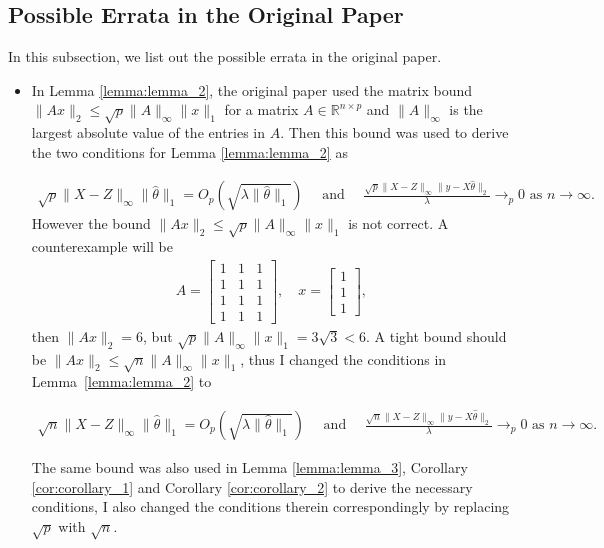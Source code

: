 \documentclass[a4paper]{article}
\newcommand{\RR}{\mathbb{R}}
\begin{document}
\subsection{Possible Errata in the Original Paper}
In this subsection, we list out the possible errata in the original paper.

\begin{itemize}
\item In Lemma \ref{lemma:lemma_2}, the original paper used the matrix bound $\|Ax\|_2\leq \sqrt{p}\|A\|_\infty\|x\|_1$ for a matrix $A\in\RR^{n\times p}$ and $\|A\|_\infty$ is the largest absolute value of the entries in $A$. Then this bound was used to derive the two conditions for Lemma \ref{lemma:lemma_2} as

\begin{align*}
\sqrt{p}\|X-Z\|_\infty\|\hat{\theta}\|_1 =O_p(\sqrt{\lambda\|\hat{\theta}\|_1}) \quad \text{ and }\quad  \frac{\sqrt{p}\|X-Z\|_\infty\|y-X\hat{\theta}\|_2}{\lambda} \rightarrow_p 0 \text{ as } n\rightarrow \infty.
\end{align*}
However the bound $\|Ax\|_2\leq \sqrt{p}\|A\|_\infty\|x\|_1$ is not correct. A counterexample will be
\begin{align*}
A = 
\begin{bmatrix}
1 & 1 & 1\\
1 & 1 & 1\\
1 & 1 & 1\\
1 & 1 & 1
\end{bmatrix}
,\quad x=
\begin{bmatrix}
1\\
1\\
1
\end{bmatrix},
\end{align*}
then $\|Ax\|_2 = 6$, but $\sqrt{p}\|A\|_\infty\|x\|_1 = 3\sqrt{3} < 6$. A tight bound should be $\|Ax\|_2\leq \sqrt{n}\|A\|_\infty\|x\|_1$, thus I changed the conditions in Lemma~\ref{lemma:lemma_2} to

\begin{align*}
\sqrt{n}\|X-Z\|_\infty\|\hat{\theta}\|_1 =O_p(\sqrt{\lambda\|\hat{\theta}\|_1}) \quad \text{ and }\quad  \frac{\sqrt{n}\|X-Z\|_\infty\|y-X\hat{\theta}\|_2}{\lambda} \rightarrow_p 0 \text{ as } n\rightarrow \infty.
\end{align*}

The same bound was also used in Lemma \ref{lemma:lemma_3}, Corollary \ref{cor:corollary_1} and Corollary \ref{cor:corollary_2} to derive the necessary conditions, I also changed the conditions therein correspondingly by replacing $\sqrt{p}$ with $\sqrt{n}$.


\end{itemize}
\end{document}
